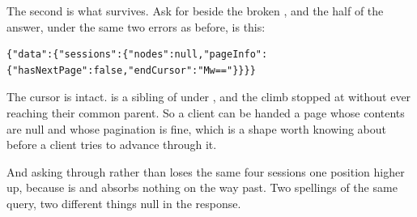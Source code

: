 %
The second is what survives. Ask for  beside the broken
, and the  half of the answer, under the same two errors
as before, is this:

\begin{verbatim}
{"data":{"sessions":{"nodes":null,"pageInfo":{"hasNextPage":false,"endCursor":"Mw=="}}}}
\end{verbatim}

%
The cursor is intact.  is a sibling of  under
, and the climb stopped at  without ever reaching
their common parent. So a client can be handed a page whose contents are null
and whose pagination is fine, which is a shape worth knowing about before a
client tries to advance through it.

%
And asking through  rather than  loses the same four
sessions one position higher up, because  is
 and absorbs nothing on the way past. Two spellings of the same
query, two different things null in the response.
%
